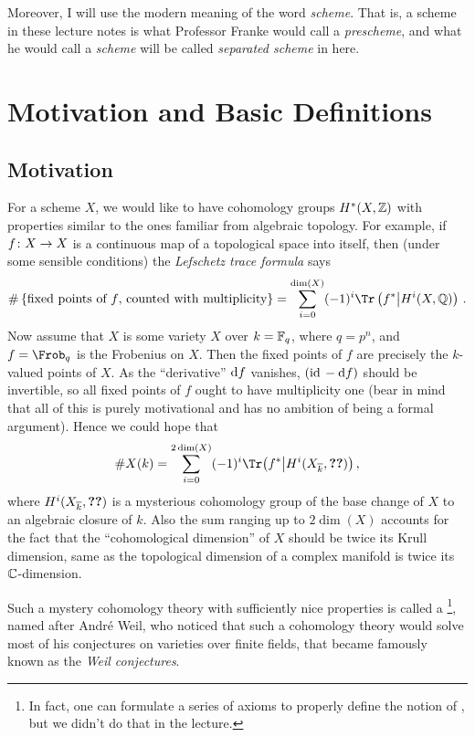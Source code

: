 \documentclass[a4paper, 10pt, oneside, DIV=9, chapterprefix=true, numbers=enddot]{scrbook}
\begin{document}
	Moreover, I will use the modern meaning of the word \emph{scheme}. That is, a scheme in these lecture notes is what Professor Franke would call a \emph{prescheme}, and what he would call a \emph{scheme} will be called \emph{separated scheme} in here.
	
	\mainmatter{}
	
	\chapter{Motivation and Basic Definitions}
	\section{Motivation}
	 For a scheme $X$, we would like to have cohomology groups $H^*(X,\mathbb{Z})$ with properties similar to the ones familiar from algebraic topology. For example, if $f\colon X\morphism X$ is a continuous map of a topological space into itself, then (under some sensible conditions) the \emph{Lefschetz trace formula} says
	\begin{equation*}
		\#\left\{\text{fixed points of }f\text{, counted with multiplicity}\right\}=\sum_{i=0}^{\dim(X)}(-1)^i\Tr\left(f^ *\middle| H^i(X,\IQ)\right)\,.
	\end{equation*}
	Now assume that $X$ is some variety $X$ over $k=\mathbb{F}_q$, where $q=p^n$, and $f=\Frob_q$ is the Frobenius on $X$. Then the fixed points of $f$ are precisely the $k$-valued points of $X$. As the \enquote{derivative} $\mathrm{d} f$ vanishes, $(\operatorname{id}{}-\mathrm{d} f)$ should be invertible, so all fixed points of $f$ ought to have multiplicity one (bear in mind that all of this is purely motivational and has no ambition of being a formal argument). Hence we could hope that
	\begin{equation*}
		\# X(k)=\sum_{i=0}^{2\dim(X)}(-1)^i\Tr\big(f^*\big| H^i(X_{\ov{k}},\textbf{??})\big)\,,
	\end{equation*}
	where $H^i(X_{\ov{k}},\textbf{??})$ is a mysterious cohomology group of the base change of $X$ to an algebraic closure of $k$. Also the sum ranging up to $2\dim(X)$ accounts for the fact that the \enquote{cohomological dimension} of $X$ should be twice its Krull dimension, same as the topological dimension of a complex manifold is twice its $\mathbb{C}$-dimension.
	
	Such a mystery cohomology theory with sufficiently nice properties is called a \footnote{In fact, one can formulate a series of axioms to properly define the notion of , but we didn't do that in the lecture.}, named after André Weil, who noticed that such a cohomology theory would solve most of his conjectures on varieties over finite fields, that became famously known as the \emph{Weil conjectures}.
	
\end{document}
